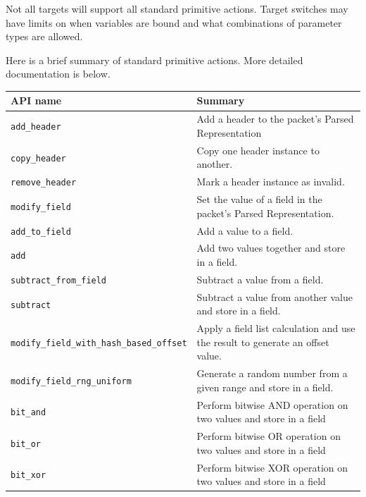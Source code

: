 \documentclass[12pt]{article}
\begin{document}
Not all targets will support all standard primitive actions. Target switches may
have limits on when variables are bound and what combinations of parameter types
are allowed.

Here is a brief summary of standard primitive actions. More detailed
documentation is below.

\begin{table}[H]
\begin{center}
\begin{tabular}{| l | p{} |} \hline
\textbf{API name} &
\textbf{Summary} \\ \hline
\texttt{add_header} &
Add a header to the packet's Parsed Representation \\ \hline
\texttt{copy_header} &
Copy one header instance to another. \\ \hline
\texttt{remove_header} &
Mark a header instance as invalid. \\ \hline
\texttt{modify_field} &
Set the value of a field in the packet's Parsed Representation. \\ \hline
\texttt{add_to_field} &
Add a value to a field. \\ \hline
\texttt{add} &
Add two values together and store in a field. \\ \hline
\texttt{subtract_from_field} &
Subtract a value from a field. \\ \hline
\texttt{subtract} &
Subtract a value from another value and store in a field. \\ \hline
\texttt{modify_field_with_hash_based_offset} &
Apply a field list calculation and use the result to generate an offset value. \\ \hline
\texttt{modify_field_rng_uniform} &
Generate a random number from a given range and store in a field. \\ \hline
\texttt{bit_and} &
Perform bitwise AND operation on two values and store in a field  \\ \hline
\texttt{bit_or} &
Perform bitwise OR operation on two values and store in a field  \\ \hline
\texttt{bit_xor} &
Perform bitwise XOR operation on two values and store in a field  \\ \hline
\end{tabular}
\end{center}
\end{table}
\end{document}
